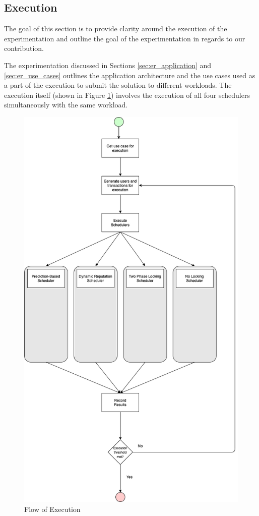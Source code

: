 \subsection{Execution}
\label{sec:er_execution}

The goal of this section is to provide clarity around the execution of the experimentation and outline the goal of the experimentation in regards to our contribution.

The experimentation discussed in Sections \ref{sec:er_application} and \ref{sec:er_use_cases} outlines the application architecture and the use cases used as a part of the execution to submit the solution to different workloads. The execution itself (shown in Figure \ref{image:flow_of_execution}) involves the execution of all four schedulers simultaneously with the same workload.

\begin{figure}
\centering
\includegraphics[scale=0.30]{images/Scheduler_Flow.png}
\caption{Flow of Execution}
\label{image:flow_of_execution}
\end{figure}


